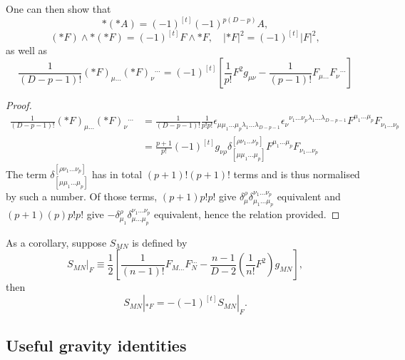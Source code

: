 One can then show that
\begin{equation}
*(*A) = (-1)^{[t]}(-1)^{p(D-p)}A,
\end{equation}
\begin{equation}
(*F)\wedge *(*F)=(-1)^{[t]}F\wedge *F,\quad
|*F|^2 = (-1)^{[t]}|F|^2,
\end{equation}
as well as
\begin{equation}
\frac{1}{(D-p-1)!}(*F)_{\mu ...}(*F)_\nu{}^{...}
=(-1)^{[t]}\left[
    \frac{1}{p!}F^2 g_{\mu\nu} - \frac{1}{(p-1)!}F_{\mu...}F_\nu{}^{...}
\right]
\end{equation}
\begin{proof}
\begin{equation}
\begin{aligned}
\frac{1}{(D-p-1)!}(*F)_{\mu ...}(*F)_\nu{}^{...}
&=\frac{1}{(D-p-1)!}\frac{1}{p!p!}
\epsilon_{\mu \mu_1...\mu_p \lambda_1...\lambda_{D-p-1}}
\epsilon_{\nu} {}^{\nu_1...\nu_p} {}^{\lambda_1...\lambda_{D-p-1}}
F^{\mu_1...\mu_p}F_{\nu_1...\nu_p}\\
&=\frac{p+1}{p!}(-1)^{[t]} g_{\nu\rho} \delta^{[\rho \nu_1...\nu_p]}_{[\mu \mu_1...\mu_p]}F^{\mu_1...\mu_p}F_{\nu_1...\nu_p}
\end{aligned}
\end{equation}
The term $\delta^{[\rho \nu_1...\nu_p]}_{[\mu \mu_1...\mu_p]}$
has in total $(p+1)!(p+1)!$ terms and is thus normalised by such a number. Of those terms, $(p+1)p!p!$ give 
$\delta^{\rho}_{\mu} \delta^{\nu_1...\nu_p}_{\mu_1...\mu_p}$
equivalent and $(p+1)(p)p!p!$ give $
-\delta^{\rho}_{\mu_1}\delta^{\nu_1...\nu_p}_{ \mu ...\mu_p}$
equivalent, hence the relation provided.
\end{proof}
As a corollary, suppose $S_{MN}$ is defined by
\begin{equation}
S_{MN}\big|_{F}\equiv
\frac{1}{2}\left[
    \frac{1}{(n-1)!}F_{M...}F_N^{...}
    -\frac{n-1}{D-2}\left(\frac{1}{n!}F^2\right)g_{MN}
\right],
\end{equation}
then
\begin{equation}
S_{MN}|_{*F} = -(-1)^{[t]}S_{MN}|_{F}.
\end{equation}


\subsection*{Useful gravity identities}

